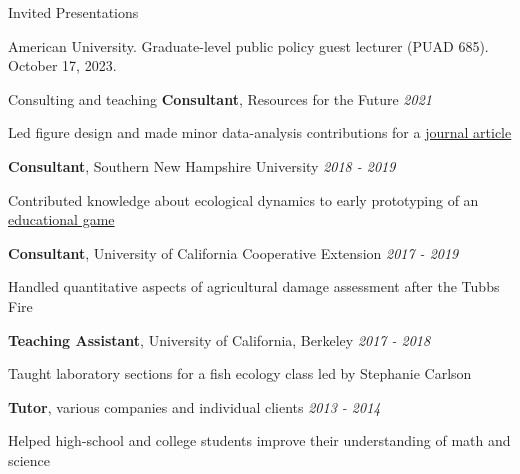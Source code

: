 \documentclass{resume} %
\begin{document}
\begin{rSection}{Invited Presentations}

{American University. Graduate-level public policy guest lecturer (PUAD 685). October 17, 2023.}

\end{rSection}

\begin{rSection}{Consulting and teaching}
{\bf Consultant}{, Resources for the Future} \hfill {\em 2021}
\vspace{-7pt}
\begin{adjustwidth}{12pt}{}
{\small Led figure design and made minor data-analysis contributions for a \href{https://www.brookings.edu/articles/the-social-cost-of-carbon/}{journal article}}
\end{adjustwidth}
{\bf Consultant}{, Southern New Hampshire University} \hfill {\em 2018 - 2019}
\vspace{-7pt}
\begin{adjustwidth}{12pt}{}
{\small Contributed knowledge about ecological dynamics to early prototyping of an \href{https://vimeo.com/417368718}{educational game}}
\end{adjustwidth}
{\bf Consultant}{, University of California Cooperative Extension} \hfill {\em 2017 - 2019}
\vspace{-7pt}
\begin{adjustwidth}{12pt}{}
{\small Handled quantitative aspects of agricultural damage assessment after the Tubbs Fire}
\end{adjustwidth}
{\bf Teaching Assistant}{, University of California, Berkeley} \hfill {\em 2017 - 2018}
\vspace{-7pt}
\begin{adjustwidth}{12pt}{}
{\small Taught laboratory sections for a fish ecology class led by Stephanie Carlson}
\end{adjustwidth}
{\bf Tutor}{, various companies and individual clients} \hfill {\em 2013 - 2014}
\vspace{-7pt}
\begin{adjustwidth}{12pt}{}
{\small Helped high-school and college students improve their understanding of math and science}
\end{adjustwidth}
\end{rSection}
\end{document}
